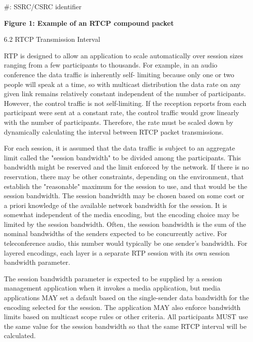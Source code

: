 \documentclass{article}
\begin{document}
\#: SSRC/CSRC identifier

\begin{center}
\textbf{Figure 1: Example of an RTCP compound packet}
\end{center}

6.2 RTCP Transmission Interval

RTP is designed to allow an application to scale automatically over session sizes ranging from a few participants to thousands.  For example, in an audio conference the data traffic is inherently self- limiting because only one or two people will speak at a time, so with multicast distribution the data rate on any given link remains relatively constant independent of the number of participants. However, the control traffic is not self-limiting.  If the reception reports from each participant were sent at a constant rate, the control traffic would grow linearly with the number of participants. Therefore, the rate must be scaled down by dynamically calculating the interval between RTCP packet transmissions.

For each session, it is assumed that the data traffic is subject to an aggregate limit called the "session bandwidth" to be divided among the participants.  This bandwidth might be reserved and the limit enforced by the network.  If there is no reservation, there may be other constraints, depending on the environment, that establish the "reasonable" maximum for the session to use, and that would be the session bandwidth.  The session bandwidth may be chosen based on some cost or a priori knowledge of the available network bandwidth for the session.  It is somewhat independent of the media encoding, but the encoding choice may be limited by the session bandwidth.  Often, the session bandwidth is the sum of the nominal bandwidths of the senders expected to be concurrently active.  For teleconference audio, this number would typically be one sender's bandwidth.  For layered encodings, each layer is a separate RTP session with its own session bandwidth parameter.

The session bandwidth parameter is expected to be supplied by a session management application when it invokes a media application, but media applications MAY set a default based on the single-sender data bandwidth for the encoding selected for the session.  The application MAY also enforce bandwidth limits based on multicast scope rules or other criteria.  All participants MUST use the same value for the session bandwidth so that the same RTCP interval will be calculated.
\end{document}
